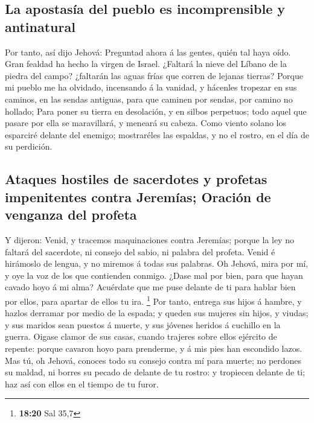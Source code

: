 \hypertarget{la-apostasuxeda-del-pueblo-es-incomprensible-y-antinatural}{%
\subsection{La apostasía del pueblo es incomprensible y
antinatural}\label{la-apostasuxeda-del-pueblo-es-incomprensible-y-antinatural}}

 Por tanto, así dijo Jehová: Preguntad ahora á las
gentes, quién tal haya oído. Gran fealdad ha hecho la virgen de Israel.
 ¿Faltará la nieve del Líbano de la piedra del campo?
¿faltarán las aguas frías que corren de lejanas tierras? 
Porque mi pueblo me ha olvidado, incensando á la vanidad, y hácenles
tropezar en sus caminos, en las sendas antiguas, para que caminen por
sendas, por camino no hollado;  Para poner su tierra en
desolación, y en silbos perpetuos; todo aquel que pasare por ella se
maravillará, y meneará su cabeza.  Como viento solano los
esparciré delante del enemigo; mostraréles las espaldas, y no el rostro,
en el día de su perdición.

\hypertarget{ataques-hostiles-de-sacerdotes-y-profetas-impenitentes-contra-jeremuxedas-oraciuxf3n-de-venganza-del-profeta}{%
\subsection{Ataques hostiles de sacerdotes y profetas impenitentes
contra Jeremías; Oración de venganza del
profeta}\label{ataques-hostiles-de-sacerdotes-y-profetas-impenitentes-contra-jeremuxedas-oraciuxf3n-de-venganza-del-profeta}}

 Y dijeron: Venid, y tracemos maquinaciones contra
Jeremías; porque la ley no faltará del sacerdote, ni consejo del sabio,
ni palabra del profeta. Venid é hirámoslo de lengua, y no miremos á
todas sus palabras.  Oh Jehová, mira por mí, y oye la voz
de los que contienden conmigo.  ¿Dase mal por bien, para
que hayan cavado hoyo á mi alma? Acuérdate que me puse delante de ti
para hablar bien por ellos, para apartar de ellos tu ira. \footnote{\textbf{18:20}
  Sal 35,7}  Por tanto, entrega sus hijos á hambre, y
hazlos derramar por medio de la espada; y queden sus mujeres sin hijos,
y viudas; y sus maridos sean puestos á muerte, y sus jóvenes heridos á
cuchillo en la guerra.  Oigase clamor de sus casas,
cuando trajeres sobre ellos ejército de repente: porque cavaron hoyo
para prenderme, y á mis pies han escondido lazos.  Mas
tú, oh Jehová, conoces todo su consejo contra mí para muerte; no
perdones su maldad, ni borres su pecado de delante de tu rostro: y
tropiecen delante de ti; haz así con ellos en el tiempo de tu furor.

